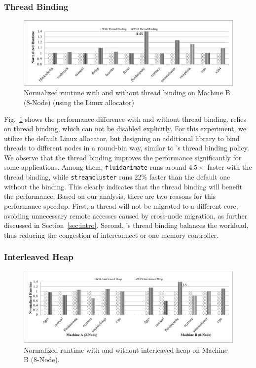 \subsubsection{Thread Binding}
\label{sec: threadbinding}

\begin{figure}[!h]
    \centering
    \includegraphics[width=\textwidth]{figure/WO-pthread-binding.pdf}
    \caption{Normalized runtime with and without thread binding on Machine B (8-Node) (using the Linux allocator)}
    \label{binding-pthread-scalibity}
\end{figure}

Fig.~\ref{binding-pthread-scalibity} shows the performance difference with and without thread binding. \NM{} relies on thread binding, which can not be disabled explicitly. For this experiment, we utilize the default Linux allocator, but designing an additional library to bind threads to different nodes in a round-bin way, similar to \NM{}'s thread binding policy. We observe that the thread binding improves the performance significantly for some applications. Among them, \texttt{fluidanimate} runs around $4.5\times$ faster with the thread binding, while  \texttt{streamcluster} runs 22\% faster than the default one without the binding. This clearly indicates that the thread binding will benefit the performance. Based on our analysis, there are two reasons for this performance speedup. First, a thread will not be migrated to a different core, avoiding unnecessary remote accesses caused by cross-node migration, as further discussed in Section~\ref{sec:intro}. Second, \NM{}'s thread binding balances the workload, thus reducing the congestion of interconnect or one memory controller.


\subsubsection{Interleaved Heap} 
\label{sec:interleavedheap}

\begin{figure}[H]
    \centering
    \includegraphics[width=\textwidth]{figure/interleavedheap.pdf}
    \caption{Normalized runtime with  and without interleaved heap on Machine B (8-Node).\label{fig:interleavedheap}}  
\end{figure}

